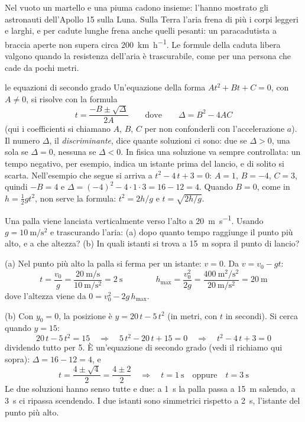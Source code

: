 \begin{attenzione}
Nel vuoto un martello e una piuma cadono insieme: l'hanno mostrato gli astronauti dell'Apollo 15 sulla Luna. Sulla Terra l'aria frena di più i corpi leggeri e larghi, e per cadute lunghe frena anche quelli pesanti: un paracadutista a braccia aperte non supera circa \SI{200}{\kilo\metre\per\hour}. Le formule della caduta libera valgono quando la resistenza dell'aria è trascurabile, come per una persona che cade da pochi metri.
\end{attenzione}

\begin{richiamo}{le equazioni di secondo grado}
Un'equazione della forma $A t^2 + B t + C = 0$, con $A \neq 0$, si risolve con la formula
\[
  t = \frac{-B \pm \sqrt{\Delta}}{2A} \qquad\text{dove}\qquad \Delta = B^2 - 4AC
\]
(qui i coefficienti si chiamano $A$, $B$, $C$ per non confonderli con l'accelerazione $a$). Il numero $\Delta$, il \emph{discriminante}, dice quante soluzioni ci sono: due se $\Delta > 0$, una sola se $\Delta = 0$, nessuna se $\Delta < 0$. In fisica una soluzione va sempre controllata: un tempo negativo, per esempio, indica un istante prima del lancio, e di solito si scarta. Nell'esempio che segue si arriva a $t^2 - 4\,t + 3 = 0$: $A = 1$, $B = -4$, $C = 3$, quindi $-B = 4$ e $\Delta = (-4)^2 - 4 \cdot 1 \cdot 3 = 16 - 12 = 4$. Quando $B = 0$, come in $h = \frac12 g t^2$, non serve la formula: $t^2 = 2h/g$ e $t = \sqrt{2h/g}$.
\end{richiamo}

\begin{esempio}
Una palla viene lanciata verticalmente verso l'alto a \SI{20}{\metre\per\second}. Usando $g = \SI{10}{\metre\per\second\squared}$ e trascurando l'aria: (a) dopo quanto tempo raggiunge il punto più alto, e a che altezza? (b) In quali istanti si trova a \SI{15}{\metre} sopra il punto di lancio?

(a) Nel punto più alto la palla si ferma per un istante: $v = 0$. Da $v = v_0 - gt$:
\[
  t = \frac{v_0}{g} = \frac{\SI{20}{\metre\per\second}}{\SI{10}{\metre\per\second\squared}} = \SI{2}{\second}
  \qquad\qquad
  h_{\max} = \frac{v_0^2}{2g} = \frac{\SI{400}{\metre\squared\per\second\squared}}{\SI{20}{\metre\per\second\squared}} = \SI{20}{\metre}
\]
dove l'altezza viene da $0 = v_0^2 - 2g\,h_{\max}$.

(b) Con $y_0 = 0$, la posizione è $y = 20\,t - 5\,t^2$ (in metri, con $t$ in secondi). Si cerca quando $y = 15$:
\[
  20\,t - 5\,t^2 = 15 \quad\Longrightarrow\quad 5\,t^2 - 20\,t + 15 = 0 \quad\Longrightarrow\quad t^2 - 4\,t + 3 = 0
\]
dividendo tutto per 5. È un'equazione di secondo grado (vedi il richiamo qui sopra): $\Delta = 16 - 12 = 4$, e
\[
  t = \frac{4 \pm \sqrt 4}{2} = \frac{4 \pm 2}{2} \quad\Longrightarrow\quad t = \SI{1}{\second} \quad\text{oppure}\quad t = \SI{3}{\second}
\]
Le due soluzioni hanno senso tutte e due: a \SI{1}{\second} la palla passa a \SI{15}{\metre} salendo, a \SI{3}{\second} ci ripassa scendendo. I due istanti sono simmetrici rispetto a \SI{2}{\second}, l'istante del punto più alto.
\end{esempio}


